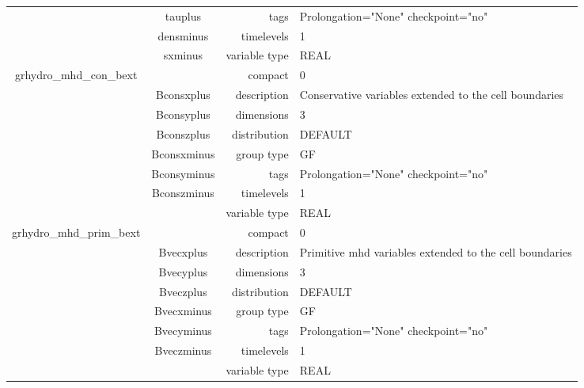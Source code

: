 \begin{tabular*}{150mm}{|c|c@{\extracolsep{\fill}}|rl|}
 & tauplus & tags & Prolongation="None" checkpoint="no" \\ 
 & densminus & timelevels & 1 \\ 
 & sxminus & variable type & REAL \\ 
\hline 
grhydro\_mhd\_con\_bext &  & compact & 0 \\ 
 & Bconsxplus & description & Conservative variables extended to the cell boundaries \\ 
 & Bconsyplus & dimensions & 3 \\ 
 & Bconszplus & distribution & DEFAULT \\ 
 & Bconsxminus & group type & GF \\ 
 & Bconsyminus & tags & Prolongation="None" checkpoint="no" \\ 
 & Bconszminus & timelevels & 1 \\ 
 &  & variable type & REAL \\ 
\hline 
grhydro\_mhd\_prim\_bext &  & compact & 0 \\ 
 & Bvecxplus & description & Primitive mhd variables extended to the cell boundaries \\ 
 & Bvecyplus & dimensions & 3 \\ 
 & Bveczplus & distribution & DEFAULT \\ 
 & Bvecxminus & group type & GF \\ 
 & Bvecyminus & tags & Prolongation="None" checkpoint="no" \\ 
 & Bveczminus & timelevels & 1 \\ 
 &  & variable type & REAL \\ 
\hline 
\end{tabular*} 



\vspace{5mm}
\vspace{5mm}

